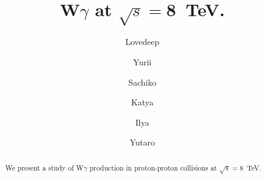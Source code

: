 \documentclass{article}
\begin{document}
 
\pagestyle{empty}
\pagenumbering{}
\title{\textbf{W$\gamma$ at $\sqrt{s}=$8~TeV.}}

\author[1]{Lovedeep}
\author[1]{Yurii}
\author[1]{Sachiko}
\author[2]{Katya}
\author[2]{Ilya}
\author[3]{Yutaro}

\maketitle

\begin{abstract}
We present a study of W$\gamma$ production in proton-proton
collisions at $\sqrt{s} = 8$~TeV. 
\end{abstract}

\thispagestyle{empty}
\newpage



\pagestyle{fancy}
\fancyhf{}
\lhead[]{\thepage}
\rhead[\thepage]{}

\tableofcontents

%
\linenumbers
\clearpage



\clearpage
\end{document}
